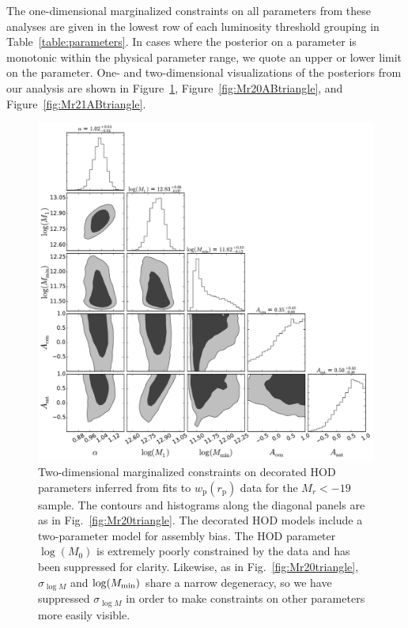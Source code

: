 \documentclass[usenatbib,usegraphicx,letterpaper]{mn2e}
\newcommand{\wprp}{w_{\mathrm{p}}}
\newcommand{\rp}{r_{\mathrm{p}}}
\begin{document}
The one-dimensional marginalized constraints on all parameters from these analyses 
are given in the lowest row of each luminosity threshold grouping in Table~\ref{table:parameters}. 
In cases where the posterior on a parameter is monotonic within the physical parameter 
range, we quote an upper or lower limit on the parameter. One- and two-dimensional 
visualizations of the posteriors from our analysis are shown in Figure~\ref{fig:Mr19ABtriangle}, 
Figure~\ref{fig:Mr20ABtriangle}, and Figure~\ref{fig:Mr21ABtriangle}. 


\begin{figure}
\begin{center}
\includegraphics[width=15.0cm]{Mr19ABTri.pdf}
\caption{
Two-dimensional marginalized constraints on decorated HOD parameters inferred from fits 
to $\wprp(\rp)$ data for the $M_r<-19$ sample. The contours and histograms along the diagonal 
panels are as in Fig.~\ref{fig:Mr20triangle}. The decorated HOD models include a 
two-parameter model for assembly bias. The HOD parameter $\log (M_0)$ is extremely 
poorly constrained by the data and has been suppressed for clarity. Likewise, as in 
Fig.~\ref{fig:Mr20triangle}, $\sigma_{\log M}$ and $\log (M_{\rm min})$ share a 
narrow degeneracy, so we have suppressed $\sigma_{\log M}$ in order to make 
constraints on other parameters more easily visible.
}
\label{fig:Mr19ABtriangle}
\end{center}
\end{figure}
\end{document}
